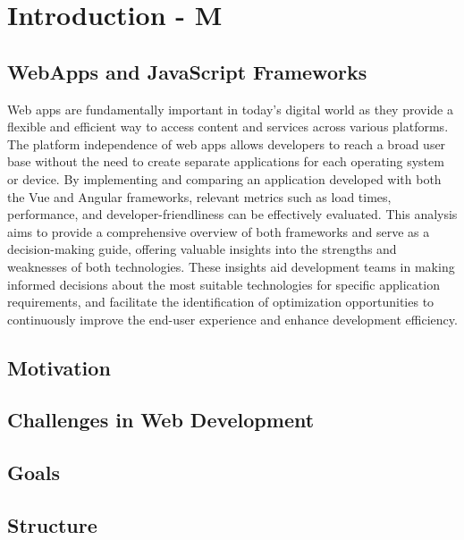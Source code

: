 \chapter{Introduction - M}
\label{cha:Introduction}


\section{WebApps and JavaScript Frameworks}

Web apps are fundamentally important in today's digital world as they provide a flexible and efficient way to access content and services across various platforms. The platform independence of web apps allows developers to reach a broad user base without the need to create separate applications for each operating system or device. By implementing and comparing an application developed with both the Vue and Angular frameworks, relevant metrics such as load times, performance, and developer-friendliness can be effectively evaluated. This analysis aims to provide a comprehensive overview of both frameworks and serve as a decision-making guide, offering valuable insights into the strengths and weaknesses of both technologies. These insights aid development teams in making informed decisions about the most suitable technologies for specific application requirements, and facilitate the identification of optimization opportunities to continuously improve the end-user experience and enhance development efficiency.

\section{Motivation}
\section{Challenges in Web Development}

\section{Goals}

\section{Structure} %


